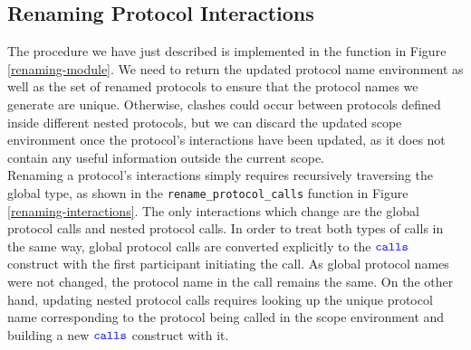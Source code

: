 \documentclass[12pt,twoside]{report}
\begin{document}
\subsection{Renaming Protocol Interactions}

The procedure we have just described is implemented in the \texttt{} function in Figure \ref{renaming-module}. We need to return the updated protocol name environment as well as the set of renamed protocols to ensure that the protocol names we generate are unique. Otherwise, clashes could occur between protocols defined inside different nested protocols, but we can discard the updated scope environment once the protocol's interactions have been updated, as it does not contain any useful information outside the current scope. \\

Renaming a protocol's interactions simply requires recursively traversing the global type, as shown in the \texttt{rename\_protocol\_calls} function in Figure \ref{renaming-interactions}. The only interactions which change are the global protocol calls and nested protocol calls. In order to treat both types of calls in the same way, global protocol calls are converted explicitly to the ${\color{blue}\mathtt{calls}}$ construct with the first participant initiating the call. As global protocol names were not changed, the protocol name in the call remains the same. On the other hand, updating nested protocol calls requires looking up the unique protocol name corresponding to the protocol being called in the scope environment and building a new ${\color{blue}\mathtt{calls}}$ construct with it.\\
\end{document}
